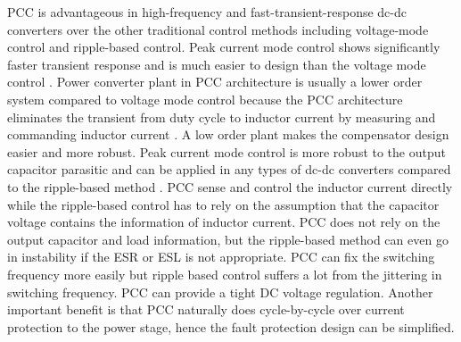 PCC is advantageous in high-frequency and fast-transient-response dc-dc converters over the other traditional control methods including voltage-mode control and ripple-based control. Peak current mode control shows significantly faster transient response and is much easier to design than the voltage mode control \cite{erikson2007}. Power converter plant in PCC architecture is usually a lower order system compared to voltage mode control because the PCC architecture eliminates the transient from duty cycle to inductor current by measuring and commanding inductor current \cite{Bram2015tpel}. A low order plant makes the compensator design easier and more robust. Peak current mode control is more robust to the output capacitor parasitic and can be applied in any types of dc-dc converters compared to the ripple-based method \cite{Redljian2009tpel}. PCC sense and control the inductor current directly while the ripple-based control has to rely on the assumption that the capacitor voltage contains the information of inductor current. PCC does not rely on the output capacitor and load information, but the ripple-based method can even go in instability if the ESR or ESL is not appropriate. PCC can fix the switching frequency more easily but ripple based control suffers a lot from the jittering in switching frequency. PCC can provide a tight DC voltage regulation. Another important benefit is that PCC naturally does cycle-by-cycle over current protection to the power stage, hence the fault protection design can be simplified. 

